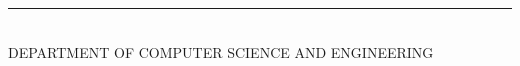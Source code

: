 \begin{adjustwidth}{0.25in}{0.25in}
\vspace{3cm}


\begin{center}
\begin{minipage}[c]{0.45\textwidth}
\centering
\rule{7cm}{0.5pt} 
\vspace{1.5cm}
\end{minipage}
\end{center}



\begin{center}
    \noindent\makebox[\linewidth]{\dotfill}\\[1ex]
    DEPARTMENT OF COMPUTER SCIENCE AND ENGINEERING\\[1ex]
    \noindent\makebox[\linewidth]{\dotfill}
\end{center}

    
\vspace*{\fill} %

\end{adjustwidth}